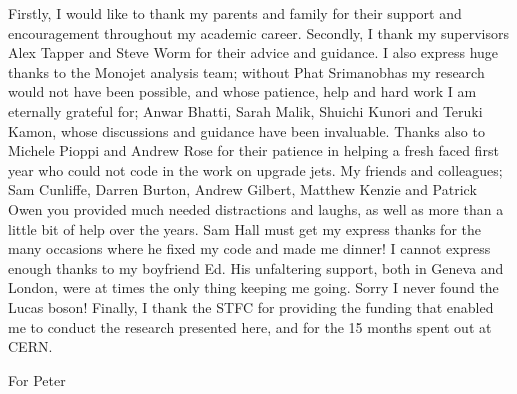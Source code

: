 \begin{acknowledgements}
  Firstly, I would like to thank my parents and family for their support and encouragement throughout my academic career.
  Secondly, I thank my supervisors Alex Tapper and Steve Worm for their advice and guidance.
  I also express huge thanks to the Monojet analysis team; without Phat Srimanobhas my research would not have been possible, and whose patience, help and hard work I am eternally grateful for; Anwar Bhatti, Sarah Malik, Shuichi Kunori and Teruki Kamon, whose discussions and guidance have been invaluable.
  Thanks also to Michele Pioppi and Andrew Rose for their patience in helping a fresh faced first year who could not code in the work on upgrade jets.
  My friends and colleagues; Sam Cunliffe, Darren Burton, Andrew Gilbert, Matthew Kenzie and Patrick Owen you provided much needed distractions and laughs, as well as more than a little bit of help over the years. 
  Sam Hall must get my express thanks for the many occasions where he fixed my code and made me dinner!
  I cannot express enough thanks to my boyfriend Ed. 
  His unfaltering support, both in Geneva and London, were at times the only thing keeping me going. Sorry I never found the Lucas boson!
  Finally, I thank the STFC for providing the funding that enabled me to conduct the research presented here, and for the 15 months spent out at CERN.
\end{acknowledgements}




\tableofcontents

\frontquote%
  {For Peter}%
  {}
